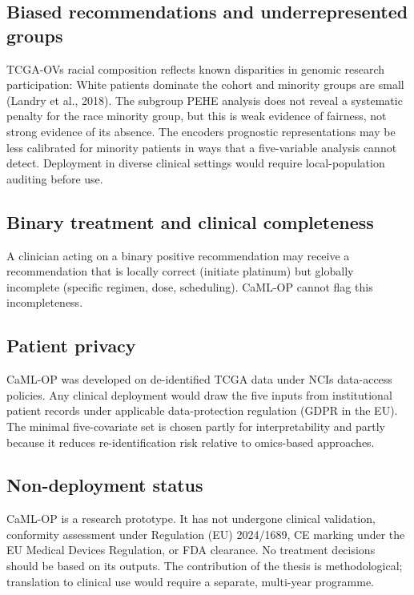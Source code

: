 \subsection{Biased recommendations and underrepresented groups}\label{biased-recommendations-and-underrepresented-groups}

TCGA-OV\textquotesingle s racial composition reflects known disparities in genomic research participation: White patients dominate the cohort and minority groups are small (Landry et al., 2018). The subgroup PEHE analysis does not reveal a systematic penalty for the race minority group, but this is weak evidence of fairness, not strong evidence of its absence. The encoder\textquotesingle s prognostic representations may be less calibrated for minority patients in ways that a five-variable analysis cannot detect. Deployment in diverse clinical settings would require local-population auditing before use.

\subsection{Binary treatment and clinical completeness}\label{binary-treatment-and-clinical-completeness}

A clinician acting on a binary positive recommendation may receive a recommendation that is locally correct (initiate platinum) but globally incomplete (specific regimen, dose, scheduling). CaML-OP cannot flag this incompleteness.

\subsection{Patient privacy}\label{patient-privacy}

CaML-OP was developed on de-identified TCGA data under NCI\textquotesingle s data-access policies. Any clinical deployment would draw the five inputs from institutional patient records under applicable data-protection regulation (GDPR in the EU). The minimal five-covariate set is chosen partly for interpretability and partly because it reduces re-identification risk relative to omics-based approaches.

\subsection{Non-deployment status}\label{non-deployment-status}

CaML-OP is a research prototype. It has not undergone clinical validation, conformity assessment under Regulation (EU) 2024/1689, CE marking under the EU Medical Devices Regulation, or FDA clearance. No treatment decisions should be based on its outputs. The contribution of the thesis is methodological; translation to clinical use would require a separate, multi-year programme.

